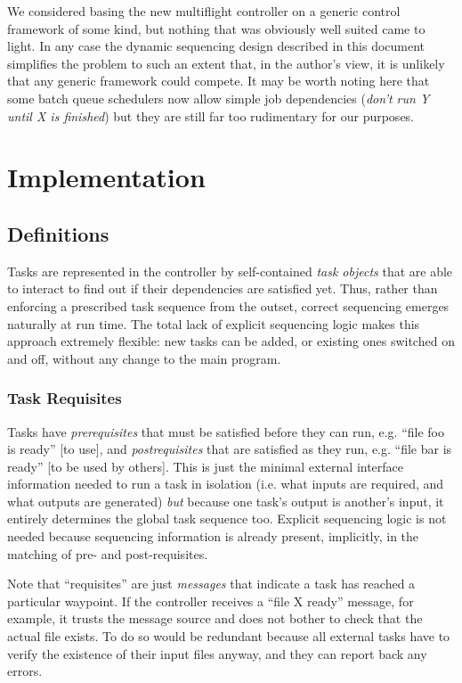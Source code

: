 \documentclass[11pt,a4paper]{report}
\begin{document}
We considered basing the new multiflight controller on a generic control
framework of some kind, but nothing that was obviously well suited came
to light. In any case the dynamic sequencing design described in this
document simplifies the problem to such an extent that, in the author's
view, it is unlikely that any generic framework could compete.  It may
be worth noting here that some batch queue schedulers now allow simple
job dependencies ({\em don't run Y until X is finished}) but they are
still far too rudimentary for our purposes.


\chapter{Implementation}


\section{Definitions}

Tasks are represented in the controller by self-contained {\em task
objects} that are able to interact to find out if their dependencies are
satisfied yet. Thus, rather than enforcing a prescribed task sequence
from the outset, correct sequencing emerges naturally at run time. The
total lack of explicit sequencing logic makes this approach extremely
flexible: new tasks can be added, or existing ones switched on and off,
without any change to the main program.

\subsection{Task Requisites}

Tasks have {\em prerequisites} that must be satisfied before they can
run, e.g. ``file foo is ready'' [to use], and {\em postrequisites} that
are satisfied as they run, e.g. ``file bar is ready'' [to be used by
others]. This is just the minimal external interface information needed
to run a task in isolation (i.e. what inputs are required, and what
outputs are generated) {\em but} because one task's output is another's
input, it entirely determines the global task sequence too. Explicit
sequencing logic is not needed because sequencing information is already
present, implicitly, in the matching of pre- and post-requisites. 

Note that ``requisites'' are just {\em messages} that indicate a task
has reached a particular waypoint.  If the controller receives a ``file
X ready'' message, for example, it trusts the message source and does
not bother to check that the actual file exists. To do so would be
redundant because all external tasks have to verify the existence of
their input files anyway, and they can report back any errors.
\end{document}
